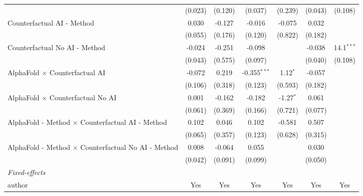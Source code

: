 \begin{tabular}{lcccccc}
                                                              & (0.023)       & (0.120)     & (0.037)        & (0.239)      & (0.043)       & (0.108)\\   
   Counterfactual AI - Method                                 & 0.030         & -0.127      & -0.016         & -0.075       & 0.032         &   \\   
                                                              & (0.055)       & (0.176)     & (0.120)        & (0.822)      & (0.182)       &   \\   
   Counterfactual No AI - Method                              & -0.024        & -0.251      & -0.098         &              & -0.038        & 14.1$^{***}$\\   
                                                              & (0.043)       & (0.575)     & (0.097)        &              & (0.040)       & (0.108)\\   
   AlphaFold $\times$ Counterfactual AI                       & -0.072        & 0.219       & -0.355$^{***}$ & 1.12$^{*}$   & -0.057        &   \\   
                                                              & (0.106)       & (0.318)     & (0.123)        & (0.593)      & (0.182)       &   \\   
   AlphaFold $\times$ Counterfactual No AI                    & 0.001         & -0.162      & -0.182         & -1.27$^{*}$  & 0.061         &   \\   
                                                              & (0.061)       & (0.369)     & (0.166)        & (0.721)      & (0.077)       &   \\   
   AlphaFold - Method $\times$ Counterfactual AI - Method     & 0.102         & 0.046       & 0.102          & -0.581       & 0.507         &   \\   
                                                              & (0.065)       & (0.357)     & (0.123)        & (0.628)      & (0.315)       &   \\   
   AlphaFold - Method $\times$ Counterfactual No AI - Method  & 0.008         & -0.064      & 0.055          &              & 0.030         &   \\   
                                                              & (0.042)       & (0.091)     & (0.099)        &              & (0.050)       &   \\   
   \midrule
   \emph{Fixed-effects}\\
   author                                                     & Yes           & Yes         & Yes            & Yes          & Yes           & Yes\\  

\end{tabular}
